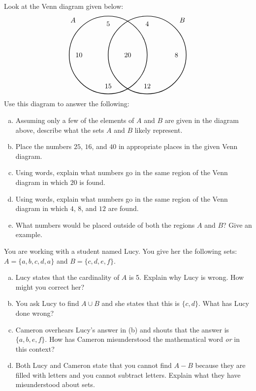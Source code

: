 \documentclass[11pt,letterpaper]{article}
\begin{document}
 Look at the Venn diagram given below:
	\[
	\begin{tikzpicture}
	\draw[line width=0.03cm] (-1,0) circle (2);
	\draw[line width=0.03cm] (1,0) circle (2);
	\node at (-2.8,1.8) {$A$}; 
	\node at (-1,1.6) {$5$}; \node at (-2.5,0) {$10$}; \node at (-1,-1.6) {$15$};
	\node at (2.8,1.8) {$B$};
	\node at (1,1.6) {$4$}; \node at (2.5,0) {$8$}; \node at (1,-1.6) {$12$};
	\node at (0,0) {$20$};
	\end{tikzpicture}
	\]
Use this diagram to answer the following:
	\begin{enumerate}[(a)]
	\item Assuming only a few of the elements of $A$ and $B$ are given in the diagram above, describe what the sets $A$ and $B$ likely represent.
	\item Place the numbers $25$, $16$, and $40$ in appropriate places in the given Venn diagram. 
	\item Using words, explain what numbers go in the same region of the Venn diagram in which $20$ is found.
	\item Using words, explain what numbers go in the same region of the Venn diagram in which $4$, $8$, and $12$ are found.
	\item What numbers would be placed outside of both the regions $A$ and $B$? Give an example.  
	\end{enumerate}



\newpage



 You are working with a student named Lucy. You give her the following sets: $A= \{ a, b, c, d, a \}$ and $B= \{ c, d, e, f \}$. 
	\begin{enumerate}[(a)]
	\item Lucy states that the cardinality of $A$ is 5. Explain why Lucy is wrong. How might you correct her?
	\item You ask Lucy to find $A \cup B$ and she states that this is $\{ c, d \}$. What has Lucy done wrong?
	\item Cameron overhears Lucy's answer in (b) and shouts that the answer is $\{ a, b, e, f \}$. How has Cameron misunderstood the mathematical word \textit{or} in this context? 
	\item Both Lucy and Cameron state that you cannot find $A - B$ because they are filled with letters and you cannot subtract letters. Explain what they have misunderstood about sets. 
	\end{enumerate}
\end{document}
